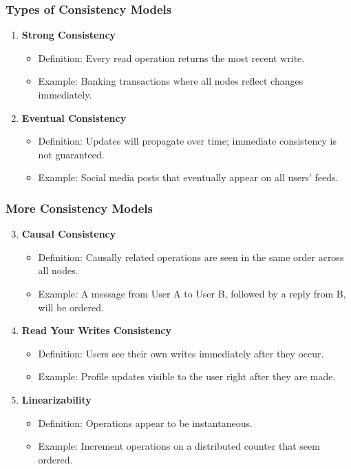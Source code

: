 \documentclass[aspectratio=169]{beamer}
\begin{document}
\begin{frame}[fragile]
    \frametitle{Types of Consistency Models}
    \begin{enumerate}
        \item \textbf{Strong Consistency}
        \begin{itemize}
            \item Definition: Every read operation returns the most recent write.
            \item Example: Banking transactions where all nodes reflect changes immediately.
        \end{itemize}

        \item \textbf{Eventual Consistency}
        \begin{itemize}
            \item Definition: Updates will propagate over time; immediate consistency is not guaranteed.
            \item Example: Social media posts that eventually appear on all users' feeds.
        \end{itemize}
    \end{enumerate}
\end{frame}

\begin{frame}[fragile]
    \frametitle{More Consistency Models}
    \begin{enumerate}
        \setcounter{enumi}{2}
        \item \textbf{Causal Consistency}
        \begin{itemize}
            \item Definition: Causally related operations are seen in the same order across all nodes.
            \item Example: A message from User A to User B, followed by a reply from B, will be ordered.
        \end{itemize}

        \item \textbf{Read Your Writes Consistency}
        \begin{itemize}
            \item Definition: Users see their own writes immediately after they occur.
            \item Example: Profile updates visible to the user right after they are made.
        \end{itemize}

        \item \textbf{Linearizability}
        \begin{itemize}
            \item Definition: Operations appear to be instantaneous.
            \item Example: Increment operations on a distributed counter that seem ordered.
        \end{itemize}
    \end{enumerate}
\end{frame}
\end{document}
